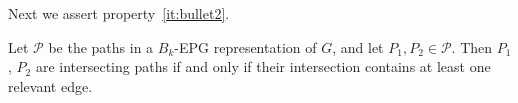 \documentclass[runningheads]{llncs}
\begin{document}
Next we assert property~\ref{it:bullet2}.

\begin{lemma}\label{lem:relevantEdges}
Let $\mathcal{P}$ be the paths in a $B_k$-EPG representation of $G$, and let $P_1, P_2\in \mathcal{P}$. Then $P_1$, $P_2$ are intersecting paths if and only if their intersection contains at least one relevant edge.
\end{lemma}







 
\end{document}
